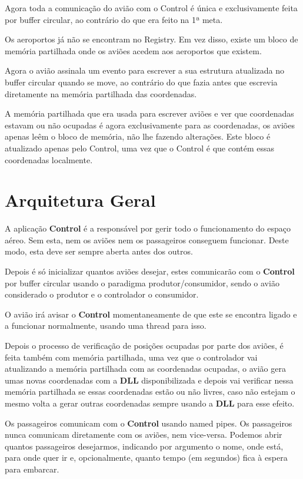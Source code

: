 \documentclass[11pt]{article}
\begin{document}
	Agora toda a comunicação do avião com o Control é única e exclusivamente feita por buffer circular, ao contrário do que era feito na 1ª meta.
	
	Os aeroportos já não se encontram no Registry. Em vez disso, existe um bloco de memória partilhada onde os aviões acedem aos aeroportos que existem.
	
	Agora o avião assinala um evento para escrever a sua estrutura atualizada no buffer circular quando se move, ao contrário do que fazia antes que escrevia diretamente na memória partilhada das coordenadas.
	
	A memória partilhada que era usada para escrever aviões e ver que coordenadas estavam ou não ocupadas é agora exclusivamente para as coordenadas, os aviões apenas leêm o bloco de memória, não lhe fazendo alterações. Este bloco é atualizado apenas pelo Control, uma vez que o Control é que contém essas coordenadas localmente.
    
    
	\large
	\section{Arquitetura Geral}
	\normalsize
	
	A aplicação \textbf{Control} é a responsável por gerir todo o funcionamento do espaço aéreo. Sem esta, nem os aviões nem os passageiros conseguem funcionar. Deste modo, esta deve ser sempre aberta antes dos outros.
	
	Depois é só inicializar quantos aviões desejar, estes comunicarão com o \textbf{Control} por buffer circular usando o paradigma produtor/consumidor, sendo o avião considerado o produtor e o controlador o consumidor.
	
	O avião irá avisar o \textbf{Control} momentaneamente de que este se encontra ligado e a funcionar normalmente, usando uma thread para isso.
	
	Depois o processo de verificação de posições ocupadas por parte dos aviões, é feita também com memória partilhada, uma vez que o controlador vai atualizando a memória partilhada com as coordenadas ocupadas, o avião gera umas novas coordenadas com a \textbf{DLL} disponibilizada e depois vai verificar nessa memória partilhada se essas coordenadas estão ou não livres, caso não estejam o mesmo volta a gerar outras coordenadas sempre usando a \textbf{DLL} para esse efeito.
	
	Os passageiros comunicam com o \textbf{Control} usando named pipes. Os passageiros nunca comunicam diretamente com os aviões, nem vice-versa. Podemos abrir quantos passageiros desejarmos, indicando por argumento o nome, onde está, para onde quer ir e, opcionalmente, quanto tempo (em segundos) fica à espera para embarcar.
	
\end{document}
